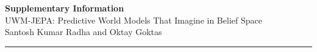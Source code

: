 \documentclass[10pt,a4paper,twocolumn]{article}
\begin{document}
\clearpage
\onecolumn
\appendix

\setcounter{figure}{0}
\setcounter{table}{0}
\setcounter{equation}{0}
\renewcommand{\thefigure}{S\arabic{figure}}
\renewcommand{\thetable}{S\arabic{table}}
\renewcommand{\theequation}{S\arabic{equation}}
\renewcommand{\thesection}{S\arabic{section}}
\renewcommand{\thesubsection}{S\arabic{section}.\arabic{subsection}}

\begin{center}
  \vspace{20pt}
  {\Large\bfseries Supplementary Information}\\[10pt]
  {\large UWM-JEPA: Predictive World Models That Imagine in Belief Space}\\[6pt]
  {Santosh Kumar Radha and Oktay Goktas}
  \vspace{12pt}
\end{center}

\noindent\rule{\textwidth}{0.4pt}
\vspace{10pt}





\end{document}
